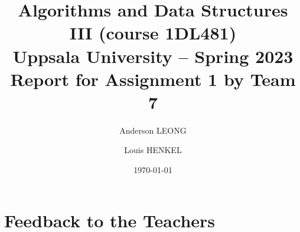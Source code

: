 \documentclass[a4paper,11pt,hidelinks]{article}
\title{\textbf{Algorithms and Data Structures III (course 1DL481) \\
    Uppsala University -- Spring 2023 \\
    Report for Assignment 1  %
    by Team 7}}              %
\author{Anderson LEONG \and Louis HENKEL}
\date{\today}
\newcommand{\todo}[1]{{\color{blue}#1}}  %
\begin{document}
\maketitle


  

%

%



\clearpage


\clearpage
\section*{Feedback to the Teachers}





\todo{}
\end{document}
